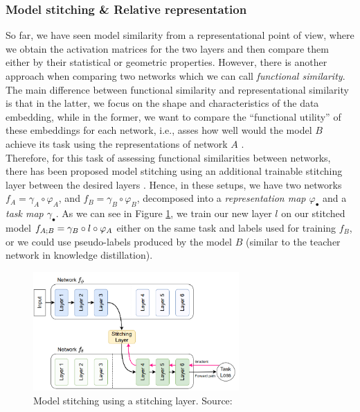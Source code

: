 \documentclass[../main.tex]{subfiles}
\begin{document}
\subsubsection*{Model stitching \& Relative representation}
So far, we have seen model similarity from a representational point of view, where we obtain the activation matrices for the two layers and then compare them either by their statistical or geometric properties. However, there is another approach when comparing two networks which we can call \emph{functional similarity}. The main difference between functional similarity and representational similarity is that in the latter, we focus on the shape and characteristics of the data embedding, while in the former, we want to compare the ``functional utility'' of these embeddings for each network, i.e., asses how well would the model $B$ achieve its task using the representations of network $A$ \cite{csiszarik_similarity_2021}.\\

Therefore, for this task of assessing functional similarities between networks, there has been proposed model stitching using an additional trainable stitching layer between the desired layers \cite{csiszarik_similarity_2021, bansal_revisiting_2021, li_convergent_2016}. Hence, in these setups, we have two networks $f_A=\gamma_A \circ \varphi_A$, and $f_B=\gamma_B \circ \varphi_B$, decomposed into a \emph{representation map $\varphi_\bullet$} and a \emph{task map $\gamma_\bullet$}. As we can see in Figure \ref{fig:stich_lay}, we train our new layer $l$ on our stitched model $f_{A \mathbin{;} B}=\gamma_B \circ l \circ \varphi_A$ either on the same task and labels used for training $f_B$, or we could use pseudo-labels produced by the model $B$ (similar to the teacher network in knowledge distillation). 

\begin{figure}[!ht]
    \centering
    \includegraphics[width=0.7\textwidth]{figures/bg/stich_lay.png} 
    \caption{Model stitching using a stitching layer. Source: \cite{csiszarik_similarity_2021}}
    \label{fig:stich_lay}
\end{figure}
\end{document}

